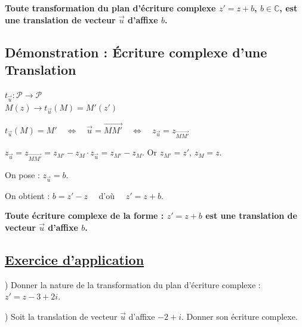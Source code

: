 \documentclass[12pt,a4paper]{article}
\begin{document}
\noindent \textbf{Toute transformation du plan d'écriture complexe $z' = z + b$, $b \in \mathbb{C}$, est une translation de vecteur $\vec{u}$ d'affixe $b$.}

\vspace{0.5em}
\subsection*{Démonstration : Écriture complexe d'une Translation}
\vspace{1em}

\begin{center}
    $t_{\vec{u}} : \mathcal{P} \to \mathcal{P}$ \\
    $M(z) \to t_{\vec{u}}(M) = M'(z')$
\end{center}

\noindent $t_{\vec{u}}(M) = M' \quad \iff \quad \vec{u} = \vec{MM'} \quad \iff \quad z_{\vec{u}} = z_{\vec{MM'}}$

\vspace{1em}

\noindent $z_{\vec{u}} = z_{\vec{MM'}} = z_{M'} - z_{M} \cdot z_{\vec{u}} = z_{M'} - z_{M}$. Or $z_{M'} = z'$, $z_{M} = z$.

\vspace{1em}

\noindent On pose : $z_{\vec{u}} = b$.

\vspace{1em}

\noindent On obtient : $b = z' - z \quad$ d'où $\quad z' = z + b$.

\vspace{1em}

\noindent \textbf{Toute écriture complexe de la forme : $z' = z + b$ est une translation de vecteur $\vec{u}$ d'affixe $b$.}

\subsection*{ \underline{Exercice d'application}}

\vspace{1em}

) Donner la nature de la transformation du plan d'écriture complexe : $z' = z - 3 + 2i$.

) Soit la translation de vecteur $\vec{u}$ d'affixe $-2 + i$. Donner son écriture complexe.

\vspace{1em}
\end{document}
